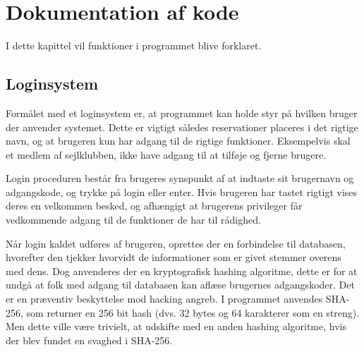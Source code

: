 \chapter{Dokumentation af kode} \label{chap:kode_docs}
I dette kapittel vil funktioner i programmet blive forklaret.

\section{Loginsystem} \label{sec:login}
Formålet med et loginsystem er, at programmet kan holde styr på hvilken bruger der anvender systemet. 
Dette er vigtigt således reservationer placeres i det rigtige navn, og at brugeren kun har adgang til de rigtige funktioner. 
Eksempelvis skal et medlem af sejlklubben, ikke have adgang til at tilføje og fjerne brugere. 

Login proceduren består fra brugeres synspunkt af at indtaste sit brugernavn og adgangskode, og trykke på login eller enter. 
Hvis brugeren har tastet rigtigt vises deres en velkommen besked, og afhængigt at brugerens privileger får vedkommende adgang til de funktioner de har til rådighed.

Når login kaldet udføres af brugeren, oprettes der en forbindelse til databasen, hvorefter den tjekker hvorvidt de informationer som er givet stemmer overens med dens. 
Dog anvenderes der en kryptografisk hashing algoritme, dette er for at undgå at folk med adgang til databasen kan aflæse brugernes adgangskoder.
Det er en præventiv beskyttelse mod hacking angreb.
I programmet anvendes SHA-256, som returner en 256 bit hash (dvs. 32 bytes og 64 karakterer som en streng). 
Men dette ville være trivielt, at udskifte med en anden hashing algoritme, hvis der blev fundet en svaghed i SHA-256. 
